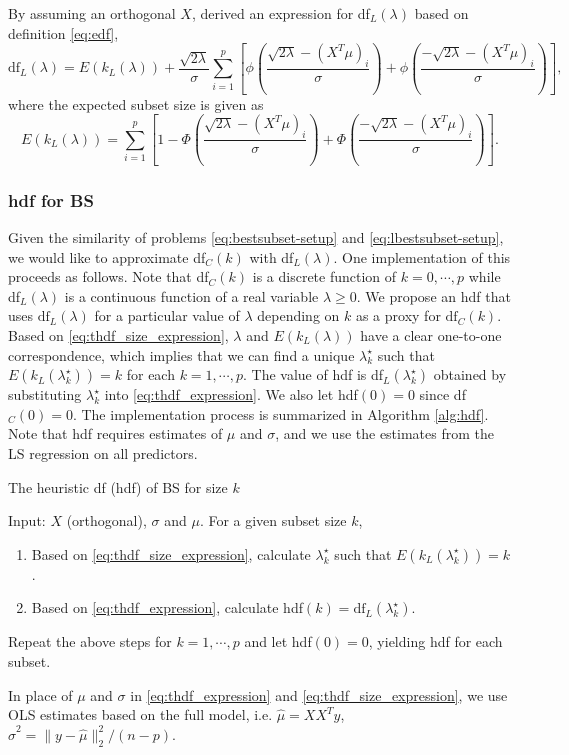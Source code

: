 By assuming an orthogonal $X$, \citet{Tibshirani2015} derived an expression for df$_L(\lambda)$ based on definition \eqref{eq:edf},
\begin{equation}
\text{df}_L(\lambda) = E(k_L(\lambda)) + \frac{\sqrt{2\lambda}}{\sigma} \sum_{i=1}^{p} \left[\phi\left(\frac{\sqrt{2\lambda}-(X^T \mu)_i}{\sigma}\right) + \phi\left(\frac{-\sqrt{2\lambda}-(X^T \mu)_i}{\sigma}\right) \right],
\label{eq:thdf_expression}
\end{equation}
where the expected subset size is given as
\begin{equation}
E(k_L(\lambda)) = \sum_{i=1}^{p} \left[1-\Phi\left(\frac{\sqrt{2\lambda}-(X^T \mu)_i}{\sigma}\right) + \Phi\left(\frac{-\sqrt{2\lambda}-(X^T \mu)_i}{\sigma}\right) \right].
\label{eq:thdf_size_expression}
\end{equation}

\subsubsection{hdf for BS}
Given the similarity of problems \eqref{eq:bestsubset-setup} and \eqref{eq:lbestsubset-setup}, we would like to approximate df$_C(k)$ with df$_L(\lambda)$. One implementation of this proceeds as follows. Note that df$_C(k)$ is a discrete function of $k=0,\cdots,p$ while df$_L(\lambda)$ is a continuous function of a real variable $\lambda\ge 0$. We propose an hdf that uses $\text{df}_L(\lambda)$ for a particular value of $\lambda$ depending on $k$ as a proxy for $\text{df}_C(k)$. Based on \eqref{eq:thdf_size_expression}, $\lambda$ and $E(k_L(\lambda))$ have a clear one-to-one correspondence, which implies that we can find a unique $\lambda_k^\star$ such that $E(k_L(\lambda_k^\star)) = k$ for each $k=1,\cdots,p$. The value of hdf is df$_L(\lambda_k^\star)$ obtained by substituting $\lambda^\star_k$ into \eqref{eq:thdf_expression}. We also let hdf$(0)=0$ since df$_C(0)=0$. The implementation process is summarized in Algorithm \ref{alg:hdf}. Note that hdf requires estimates of $\mu$ and $\sigma$, and we use the estimates from the LS regression on all predictors. 

\begin{algorithm}
	\caption{The heuristic df (hdf) of BS for size $k$}\label{alg:hdf}
	Input: $X$ (orthogonal), $\sigma$ and $\mu$. For a given subset size $k$, 
	\begin{enumerate}[label=\arabic*.]
		\item Based on \eqref{eq:thdf_size_expression}, calculate $\lambda_k^\star$ such that $E(k_L(\lambda_k^\star)) = k$.
		\item Based on \eqref{eq:thdf_expression}, calculate hdf$(k) = \text{df}_L(\lambda_k^\star)$.
	\end{enumerate}
	Repeat the above steps for $k=1,\cdots,p$ and let hdf$(0)=0$, yielding hdf for each subset. 
	
	In place of $\mu$ and $\sigma$ in \eqref{eq:thdf_expression} and \eqref{eq:thdf_size_expression}, we use OLS estimates based on the full model, i.e. $\hat{\mu}=XX^T y$, $\hat{\sigma}^2 = \lVert y-\hat{\mu} \rVert_2^2/(n-p)$.
\end{algorithm}

